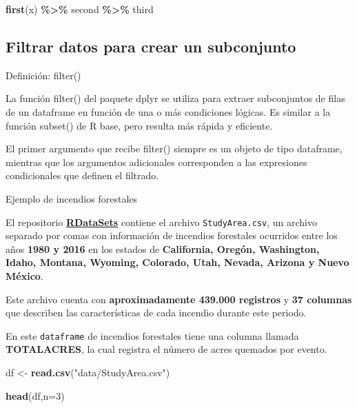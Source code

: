 \documentclass[
]{book}
\newenvironment{Shaded}{\begin{snugshade}}{\end{snugshade}}
\newcommand{\AttributeTok}[1]{\textcolor[rgb]{0.13,0.29,0.53}{#1}}
\newcommand{\DecValTok}[1]{\textcolor[rgb]{0.00,0.00,0.81}{#1}}
\newcommand{\FunctionTok}[1]{\textcolor[rgb]{0.13,0.29,0.53}{\textbf{#1}}}
\newcommand{\NormalTok}[1]{#1}
\newcommand{\OtherTok}[1]{\textcolor[rgb]{0.56,0.35,0.01}{#1}}
\newcommand{\SpecialCharTok}[1]{\textcolor[rgb]{0.81,0.36,0.00}{\textbf{#1}}}
\newcommand{\StringTok}[1]{\textcolor[rgb]{0.31,0.60,0.02}{#1}}
\begin{document}
\begin{Shaded}
\begin{Highlighting}[]
\FunctionTok{first}\NormalTok{(x) }\SpecialCharTok{\%\textgreater{}\%}
\NormalTok{  second }\SpecialCharTok{\%\textgreater{}\%}
\NormalTok{  third}
\end{Highlighting}
\end{Shaded}

\subsection{Filtrar datos para crear un subconjunto}\label{filtrar-datos-para-crear-un-subconjunto}

{} Definición: filter()

La función filter() del paquete dplyr se utiliza para
extraer subconjuntos de filas de un dataframe en función de una o más condiciones lógicas. Es similar a la función subset() de R base, pero resulta más rápida y eficiente.

El primer argumento que recibe filter() siempre es un objeto de tipo dataframe, mientras que
los argumentos adicionales corresponden a las expresiones condicionales que definen el filtrado.

{} Ejemplo de incendios forestales

El repositorio \textbf{\href{https://github.com/cdeoroaguado/Datos/blob/main/datarstudio/RDataSets.zip}{RDataSets}} contiene el archivo \texttt{StudyArea.csv}, un archivo separado por comas con información de incendios forestales ocurridos entre los años \textbf{1980 y 2016} en los estados de \textbf{California, Oregón, Washington, Idaho, Montana, Wyoming, Colorado, Utah, Nevada, Arizona y Nuevo México}.

Este archivo cuenta con \textbf{aproximadamente 439.000 registros} y \textbf{37 columnas} que describen las características de cada incendio durante este periodo.

En este \texttt{dataframe} de incendios forestales tiene una columna llamada \textbf{TOTALACRES}, la cual registra el número de acres quemados por evento.

\begin{Shaded}
\begin{Highlighting}[]
\NormalTok{df }\OtherTok{\textless{}{-}} \FunctionTok{read.csv}\NormalTok{(}\StringTok{"data/StudyArea.csv"}\NormalTok{)}

\FunctionTok{head}\NormalTok{(df,}\AttributeTok{n=}\DecValTok{3}\NormalTok{)}
\end{Highlighting}
\end{Shaded}
\end{document}

